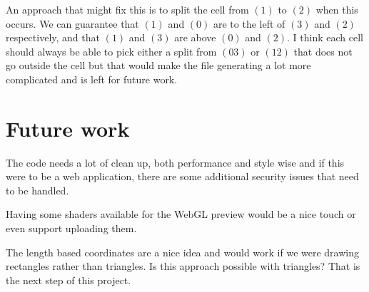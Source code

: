 \documentclass{acmsiggraph}
\begin{document}
An approach that might fix this is to split the cell from $(1)$ to $(2)$ when this occurs. We can guarantee that $(1)$ and $(0)$ are to the left of $(3)$ and $(2)$ respectively, and  that $(1)$ and $(3)$ are above $(0)$ and $(2)$. I think each cell should always be able to pick either a split from $(03)$ or $(12)$ that does not go outside the cell but that would make the file generating a lot more complicated and is left for future work.

\section{Future work}
The code needs a lot of clean up, both performance and style wise and if this were to be a web application, there are some additional security issues that need to be handled.

Having some shaders available for the WebGL preview would be a nice touch or even support uploading them.

The length based coordinates are a nice idea and would work if we were drawing rectangles rather than triangles. Is this approach possible with triangles? That is the next step of this project.

%
%
\end{document}
